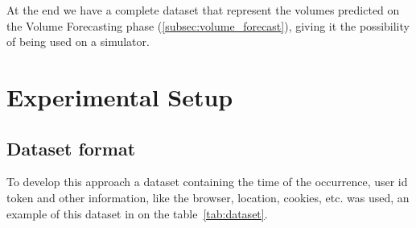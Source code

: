 At the end we have a complete dataset that represent the volumes predicted on
the Volume Forecasting phase (\ref{subsec:volume_forecast}), giving it the
possibility of being used on a simulator.

\section{Experimental Setup}

\subsection{Dataset format}

To develop this approach a dataset containing the time of the occurrence, user
id token and other information, like the browser, location, cookies, etc. was
used, an example of this dataset in on the table~\ref{tab:dataset}.

